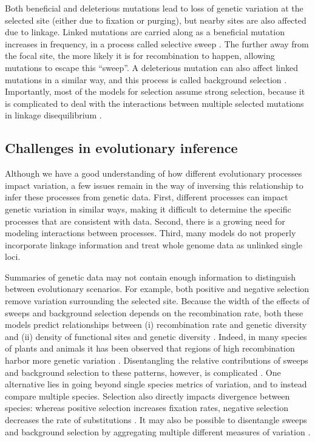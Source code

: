 Both beneficial and deleterious mutations lead to loss of genetic variation at the selected site (either due to fixation or purging),
but nearby sites are also affected due to linkage.
Linked mutations are carried along as a beneficial mutation increases in frequency, in a process called selective sweep \citep{kaplan_hitchhiking_1989, maynard_smith_hitch-hiking_1974, coop_patterns_2012}.
The further away from the focal site, the more likely it is for recombination to happen, allowing mutations to escape this ``sweep''.
A deleterious mutation can also affect linked mutations in a similar way, and this process is called background selection \citep{charlesworth_effect_1993}.
Importantly, most of the models for selection assume strong selection,
because it is complicated to deal with the interactions between multiple selected mutations in linkage disequilibrium \citep{kim_joint_2000}.

\subsection{Challenges in evolutionary inference}

Although we have a good understanding of how different evolutionary processes impact variation,
a few issues remain in the way of inversing this relationship to infer these processes from genetic data.
First, different processes can impact genetic variation in similar ways, making it difficult to determine the specific processes that are consistent with data.
Second, there is a growing need for modeling interactions between processes.
Third, many models do not properly incorporate linkage information and treat whole genome data as unlinked single loci.

Summaries of genetic data may not contain enough information to distinguish between evolutionary scenarios.
For example, both positive and negative selection remove variation surrounding the selected site.
Because the width of the effects of sweeps and background selection depends on the recombination rate,
both these models predict relationships between (i) recombination rate and genetic diversity and (ii) density of functional sites and genetic diversity \citep{charlesworth_effect_1993, kaplan_hitchhiking_1989, smith_hitch-hiking_1974}.
Indeed, in many species of plants and animals it has been observed that regions of high recombination harbor more genetic variation \citep{corbett-detig_natural_2015}.
Disentangling the relative contributions of sweeps and background selection to these patterns, however, is complicated \citep{leffler_revisiting_2012, andolfatto_adaptive_2001}.
One alternative lies in going beyond single species metrics of variation, and to instead compare multiple species.
Selection also directly impacts divergence between species: whereas positive selection increases fixation rates, 
negative selection decreases the rate of substitutions \citep{andolfatto_hitchhiking_2007,macpherson_genomewide_2007,cai_pervasive_2009} .
It may also be possible to disentangle sweeps and background selection by aggregating multiple different measures of variation \citep{schrider_background_2020}.

